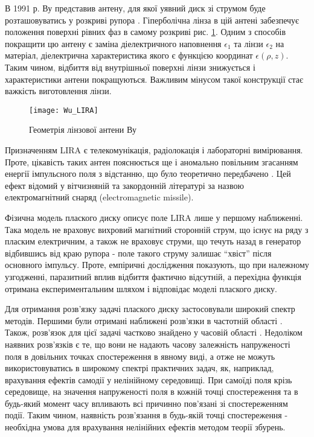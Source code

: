 В 1991 р. Ву представив антену, для якої уявний диск зі струмом буде 
розташовуватись у розкриві рупора \cite{imp:Wu1991}. Гіперболічна лінза в 
цій антені забезпечує положення поверхні рівних фаз в самому розкриві 
рис. \ref{fig:lira_wu}. Одним з способів покращити цю антену є 
заміна діелектричного наповнення $ \epsilon_1 $ та лінзи $ \epsilon_2 $ на 
матеріал, діелектрична характеристика якого є функцією координат 
$ \epsilon(\rho, z) $. Таким чином, відбиття від внутрішньої поверхні лінзи 
знижується і характеристики антени покращуються. Важливим мінусом такої 
конструкції стає важкість виготовлення лінзи.

\begin{figure}[htbp] \begin{center}
\texttt{[image: Wu\_LIRA]}
\caption{Геометрія лінзової антени Ву} \label{fig:lira_wu}
\end{center} \end{figure}

Призначенням LIRA є телекомунікація, радіолокація і лабораторні вимірювання. 
Проте, цікавість таких антен пояснюється ще і аномально повільним згасанням 
енергії імпульсного поля з відстанню, що було теоретично передбачено 
\cite{imp:Wu1987}. Цей ефект відомий у вітчизняній та закордонній літературі 
за назвою електромагнітний снаряд (electromagnetic missile).

Фізична модель плаского диску описує поле LIRA лише у першому наближенні.
Така модель не враховує вихровий магнітний сторонній струм, що існує на ряду 
з пласким електричним, а також не враховує струми, що течуть назад в 
генератор відбившись від краю рупора - поле такого струму залишає ``хвіст'' 
після основного імпульсу. Проте, емпіричні дослідження 
\cite{imp:BaumSSN0396,imp:BaumSSN0401} показують, що при належному 
узгодженні, паразитний вплив відбиття фактично відсутній, а перехідна 
функція отримана експериментальним шляхом і відповідає моделі плаского диску.

Для отримання розв'язку задачі плаского диску застосовували широкий спектр 
методів. Першими були отримані наближені розв'язки в частотній області 
\cite{imp:Wu1985,imp:Sodin1992-10}. Також, розв'язок для цієї задачі частково
знайдено у часовій області \cite{imp:Dumin1996}. Недоліком наявних розв'язків 
є те, що вони не надають часову залежність напруженості поля в довільних точках 
спостереження в явному виді, а отже не можуть використовуватись в широкому 
спектрі практичних задач, як, наприклад, врахування ефектів самодії у 
нелінійному середовищі. При самоїді поля крізь середовище, на значення 
напруженості поля в кожній точці спостереження та в будь-який момент часу 
впливають всі причинно пов'язані зі спостереженням події. Таким чином, 
наявність розв'язання в будь-якій точці спостереження - необхідна умова для 
врахування нелінійних ефектів методом теорії збурень.

